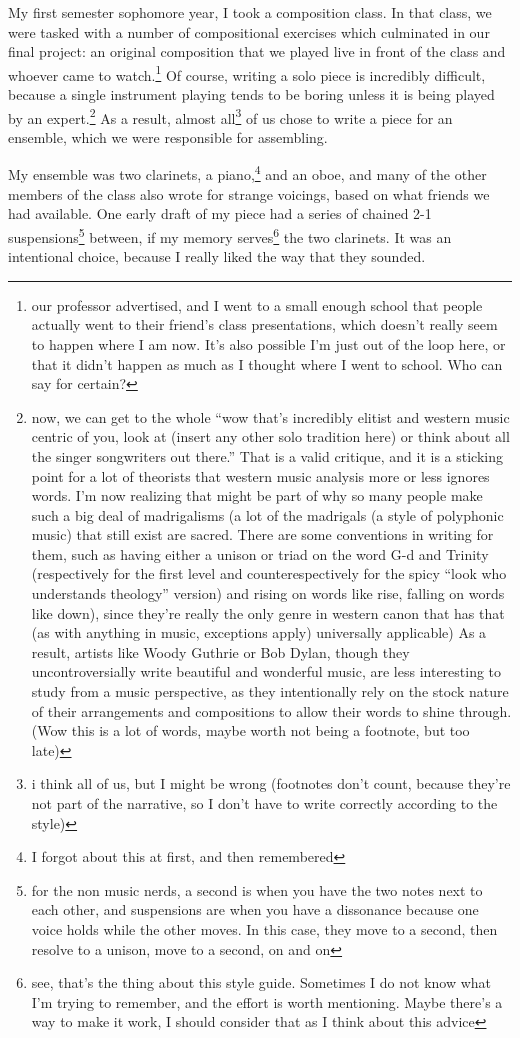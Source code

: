 \documentclass[12pt]{article}[titlepage]
\newcommand{\say}[1]{``#1''}
\newcommand{\1}{\={a}}
\newcommand{\2}{\={e}}
\newcommand{\3}{\={\i}}
\newcommand{\4}{\=o}
\newcommand{\5}{\=u}
\newcommand{\6}{\={A}}
\renewcommand{\,}{\textsuperscript{,}}
\begin{document}
My first semester sophomore year, I took a composition class.
In that class, we were tasked with a number of compositional exercises which culminated in our final project: an original composition that we played live in front of the class and whoever came to watch.\footnote{our professor advertised, and I went to a small enough school that people actually went to their friend's class presentations, which doesn't really seem to happen where I am now. It's also possible I'm just out of the loop here, or that it didn't happen as much as I thought where I went to school.
Who can say for certain?}
Of course, writing a solo piece is incredibly difficult, because a single instrument playing tends to be boring unless it is being played by an expert.\footnote{now, we can get to the whole \say{wow that's incredibly elitist and western music centric of you, look at (insert any other solo tradition here) or think about all the singer songwriters out there.} That is a valid critique, and it is a sticking point for a lot of theorists that western music analysis more or less ignores words.
I'm now realizing that might be part of why so many people make such a big deal of madrigalisms (a lot of the madrigals (a style of polyphonic music) that still exist are sacred.
There are some conventions in writing for them, such as having either a unison or triad on the word G-d and Trinity (respectively for the first level and counterespectively for the spicy \say{look who understands theology} version) and rising on words like rise, falling on words like down), since they're really the only genre in western canon that has that (as with anything in music, exceptions apply) universally applicable)
As a result, artists like Woody Guthrie or Bob Dylan, though they uncontroversially write beautiful and wonderful music, are less interesting to study from a music perspective, as they intentionally rely on the stock nature of their arrangements and compositions to allow their words to shine through.
(Wow this is a lot of words, maybe worth not being a footnote, but too late)}
As a result, almost all\footnote{i think all of us, but I might be wrong (footnotes don't count, because they're not part of the narrative, so I don't have to write correctly according to the style)} of us chose to write a piece for an ensemble, which we were responsible for assembling.

My ensemble was two clarinets, a piano,\footnote{I forgot about this at first, and then remembered} and an oboe, and many of the other members of the class also wrote for strange voicings, based on what friends we had available.
One early draft of my piece had a series of chained 2-1 suspensions\footnote{for the non music nerds, a second is when you have the two notes next to each other, and suspensions are when you have a dissonance because one voice holds while the other moves.
In this case, they move to a second, then resolve to a unison, move to a second, on and on}
between, if my memory serves\footnote{see, that's the thing about this style guide.
Sometimes I do not know what I'm trying to remember, and the effort is worth mentioning.
Maybe there's a way to make it work, I should consider that as I think about this advice}
the two clarinets.
It was an intentional choice, because I really liked the way that they sounded.
\end{document}
